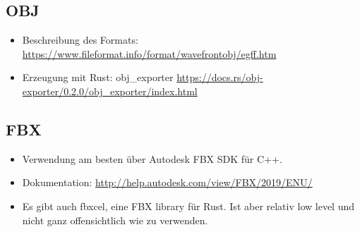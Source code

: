 \subsection{OBJ}

\begin{itemize}
 \item Beschreibung des Formats: \url{https://www.fileformat.info/format/wavefrontobj/egff.htm}
 \item Erzeugung mit Rust: obj\_exporter \url{https://docs.rs/obj-exporter/0.2.0/obj_exporter/index.html}
\end{itemize}

\subsection{FBX}

\begin{itemize}
 \item Verwendung am besten über Autodesk FBX SDK für C++. 
 \item Dokumentation: \url{http://help.autodesk.com/view/FBX/2019/ENU/}
 \item Es gibt auch fbxcel, eine FBX library für Rust. Ist aber relativ low level und nicht ganz offensichtlich wie zu verwenden.
\end{itemize}

